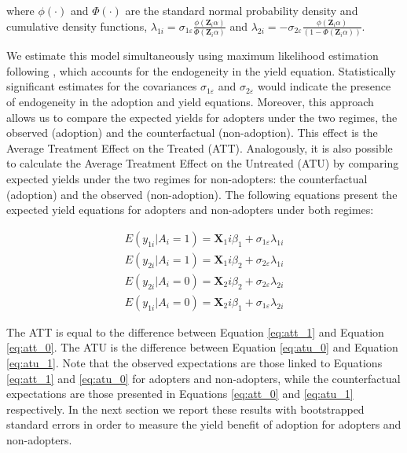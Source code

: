 \documentclass[11pt]{article}
\begin{document}
%
where $\phi(\cdot)$ and $\Phi(\cdot)$ are the standard normal probability density and cumulative density functions, $\lambda_{1i}=\sigma_{1\varepsilon}\frac{\phi(\bm{Z}_i\alpha)}{\Phi(\bm{Z}_i\alpha)}$ and $\lambda_{2i}=-\sigma_{2\varepsilon}\frac{\phi(\bm{Z}_i\alpha)}{(1-\Phi(\bm{Z}_i\alpha))}$. \par
We estimate this model simultaneously using maximum likelihood estimation following \cite{lokshin2004maximum}, which accounts for the endogeneity in the yield equation. Statistically significant estimates for the covariances $\sigma_{1\varepsilon}$ and $\sigma_{2\varepsilon}$ would indicate the presence of endogeneity in the adoption and yield equations. Moreover, this approach allows us to compare the expected yields for adopters under the two regimes, the observed (adoption) and the counterfactual (non-adoption). This effect is the Average Treatment Effect on the Treated (ATT). Analogously, it is also possible to calculate the Average Treatment Effect on the Untreated (ATU) by comparing expected yields under the two regimes for non-adopters: the counterfactual (adoption) and the observed (non-adoption). The following equations present the expected yield equations for adopters and non-adopters under both regimes:

\begin{subequations}
\begin{align}
    E(y_{1i}|A_i=1)=\bm{X}_1i\beta_1+\sigma_{1\varepsilon} \lambda_{1i} \label{eq:att_1} \\
    E(y_{2i}|A_i=1)=\bm{X}_1i\beta_2+\sigma_{2\varepsilon} \lambda_{1i} \label{eq:att_0} \\
    E(y_{2i}|A_i=0)=\bm{X}_2i\beta_2+\sigma_{2\varepsilon} \lambda_{2i} \label{eq:atu_0} \\
    E(y_{1i}|A_i=0)=\bm{X}_2i\beta_1+\sigma_{1\varepsilon} \lambda_{2i} \label{eq:atu_1}    
\end{align}
\end{subequations}

The ATT is equal to the difference between Equation \ref{eq:att_1} and Equation \ref{eq:att_0}. The ATU is the difference between Equation \ref{eq:atu_0} and Equation \ref{eq:atu_1}. Note that the observed expectations are those linked to Equations \ref{eq:att_1} and \ref{eq:atu_0} for adopters and non-adopters, while the counterfactual expectations are those presented in Equations \ref{eq:att_0} and \ref{eq:atu_1} respectively. In the next section we report these results with bootstrapped standard errors in order to measure the yield benefit of adoption for adopters and non-adopters. 
\end{document}
